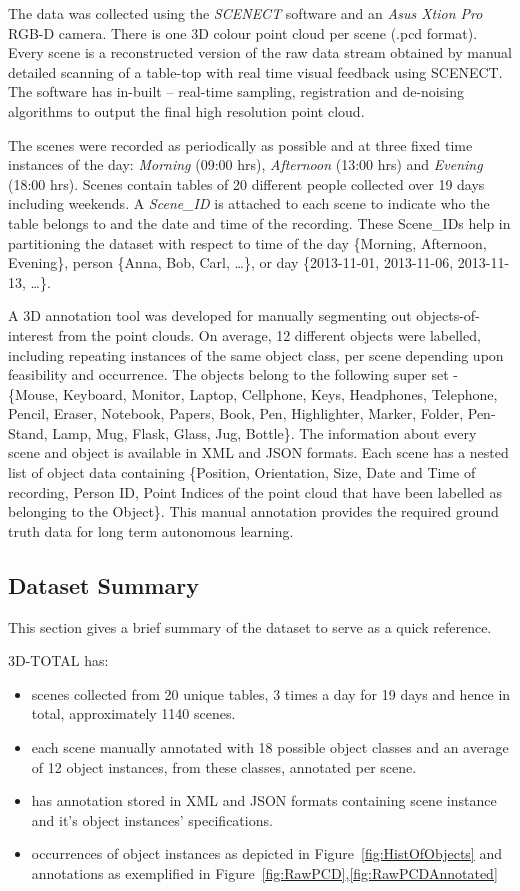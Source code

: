 \documentclass[letterpaper, 10 pt, conference]{ieeeconf}  %
\begin{document}
The data was collected using the \textit{SCENECT} software \cite{Buerkler:Online2012} and an \textit{Asus Xtion Pro} RGB-D camera. There is one 3D colour point cloud per scene (.pcd format). Every scene is a reconstructed version of the raw data stream obtained by manual detailed scanning of a table-top with real time visual feedback using SCENECT. The software has in-built -- real-time sampling, registration and de-noising algorithms to output the final high resolution point cloud.

The scenes were recorded as periodically as possible and at three fixed time instances of the day: \emph{Morning} (09:00 hrs), \emph{Afternoon} (13:00 hrs) and \emph{Evening} (18:00 hrs). Scenes contain tables of 20 different people collected over 19 days including weekends. A \textit{Scene\_ID} is attached to each scene to indicate who the table belongs to and the date and time of the recording. These Scene\_IDs help in partitioning the dataset with respect to time of the day \{Morning, Afternoon, Evening\}, person \{Anna, Bob, Carl, \dots\}, or day \{2013-11-01, 2013-11-06, 2013-11-13, \dots\}.

A 3D annotation tool was developed for manually segmenting out objects-of-interest from the point clouds. On average, 12 different objects were labelled, including repeating instances of the same object class, per scene depending upon feasibility and occurrence. The objects belong to the following super set - \{Mouse, Keyboard, Monitor, Laptop, Cellphone, Keys, Headphones, Telephone, Pencil, Eraser, Notebook, Papers,  Book, Pen, Highlighter, Marker, Folder, Pen-Stand, Lamp, Mug, Flask, Glass, Jug, Bottle\}. The information about every scene and object is available in  XML and JSON formats. Each scene has a nested list of object data containing \{Position, Orientation, Size, Date and Time of recording, Person ID, Point Indices of the point cloud that have been labelled as belonging to the Object\}. This manual annotation provides the required ground truth data for long term autonomous learning.

\subsection{Dataset Summary}
\label{ssec:Dataset Summary}
This section gives a brief summary of the dataset to serve as a quick reference.

\noindent 3D-TOTAL has:
\begin{itemize}
	\item scenes collected from 20 unique tables, 3 times a day for 19 days and hence in total, approximately 1140 scenes.
	\item each scene manually annotated with 18 possible object classes and an average of 12 object instances, from these classes, annotated per scene.
	\item has annotation stored in XML and JSON formats containing scene instance and it's object instances' specifications.
	\item occurrences of object instances as depicted in Figure~\ref{fig:HistOfObjects} and annotations as exemplified in Figure~\ref{fig:RawPCD},\ref{fig:RawPCDAnnotated}
\end{itemize}
\end{document}
